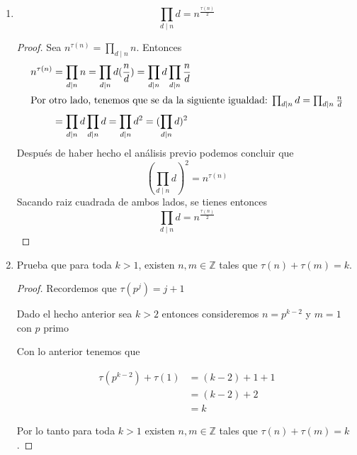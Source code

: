 \documentclass[12pt]{article}
\newcommand{\Z}{\mathbb{Z}}
\begin{document}
\begin{enumerate}
\begin{proof}
    $\Longleftarrow )$ Por demostrar: $\tau(n)$ es impar\\
    Como por hipótesis $n$ es cuadrado de la forma $n = p_1^{2\alpha_1} p_2^{2\alpha_2} \dotsm p_k^{2\alpha_k}$, 
    entonces se tiene que $\tau(n) = (2 \alpha_1 + 1) (2 \alpha_2 + 1) \dotsm (2 \alpha_k + 1)$, como 
    $(2 \alpha_i + 1)$ para $1 \geq i \geq k$ es par, entonces $(2 \alpha_1 + 1) (2 \alpha_2 + 1) \dotsm (2 \alpha_k + 1)$ 
    también es impar.\\
    Ergo $\tau(n)$ es impar.
    \end{proof}
    
    
    \item $$\prod_{d\mid n}d= n^{\frac{\tau(n)}{2}}$$
    \begin{proof}
    Sea $n^{\tau(n)} = \prod_{d \mid n} n$. Entonces
    \begin{align*}
        n^{\tau(n)}
        &= \prod_{d \mid n} n 
        = \prod_{d \mid n} d (\frac{n}{d})
        = \prod_{d \mid n} d \prod_{d \mid n} \frac{n}{d}\\
            \intertext{Por otro lado, tenemos que se da la siguiente igualdad:
            $\prod_{d \mid n} d = \prod_{d \mid n} \frac{n}{d}$}
        &= \prod_{d \mid n} d \prod_{d \mid n} d
        = \prod_{d \mid n} d^2
        = (\prod_{d \mid n} d)^2
        \end{align*}
    Después de haber hecho el análisis previo podemos concluir que
    $$(\prod_{d \mid n} d)^2 = n^{\tau(n)}$$
    Sacando raiz cuadrada de ambos lados, se tienes entonces
    $$\prod_{d \mid n} d = n^{\frac{\tau(n)}{2}}$$
    \end{proof}


    \item Prueba que para toda $k>1$, existen $n,m\in\Z$ tales que $\tau(n)+\tau(m)=k$.
    \begin{proof}
    Recordemos que $\tau(p^j) = j + 1$
    
    Dado el hecho anterior sea $k > 2$ entonces consideremos $n = p^{k-2}$ y $m = 1$ con $p$ primo
    
    Con lo anterior tenemos que 
    
    \begin{align*}
        \tau(p^{k-2}) + \tau(1) &= (k-2) + 1 + 1 \\
                                &= (k-2) + 2 \\
                                &= k
    \end{align*}
    
    
    Por lo tanto para toda $k > 1$ existen $n,m\in\Z$ tales que $\tau(n)+\tau(m)=k$.
    
    \end{proof}
    
\end{enumerate}
\end{document}
